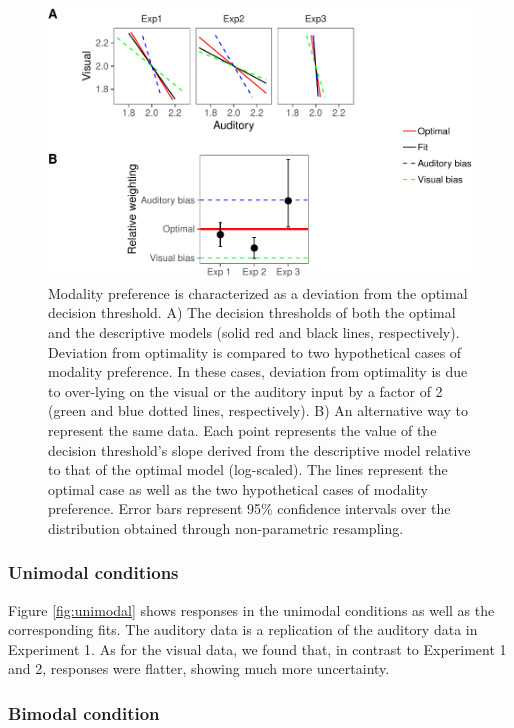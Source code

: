 \documentclass[english,,man,floatsintext]{apa6}
\theoremstyle{definition}
\theoremstyle{definition}
\theoremstyle{definition}
\theoremstyle{remark}
\begin{document}
\begin{figure}[!h]
\includegraphics[width=\textwidth]{ms_files/figure-latex/bias-1} \caption{Modality preference is characterized as a deviation from the optimal decision threshold. A) The decision thresholds of both the optimal and the descriptive models (solid red and black lines, respectively). Deviation from optimality is compared to two hypothetical cases of modality preference. In these cases, deviation from  optimality is due to over-lying on the visual or the auditory input by a factor of 2 (green and blue dotted lines, respectively). B) An alternative way to represent the same data. Each point represents the value of the decision threshold's slope derived from the descriptive model relative to that of the optimal model (log-scaled). The lines represent the optimal case as well as the two hypothetical cases of modality preference. Error bars represent 95\% confidence intervals over the distribution obtained through non-parametric resampling.}\label{fig:bias}
\end{figure}

\subsubsection{Unimodal conditions}\label{unimodal-conditions-2}

Figure \ref{fig:unimodal} shows responses in the unimodal conditions as
well as the corresponding fits. The auditory data is a replication of
the auditory data in Experiment 1. As for the visual data, we found
that, in contrast to Experiment 1 and 2, responses were flatter, showing
much more uncertainty.

\subsubsection{Bimodal condition}\label{bimodal-condition-3}
\end{document}
